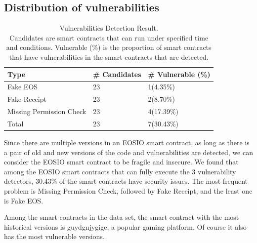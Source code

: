 \documentclass[a4paper, 10pt, conference, twocolumn]{ieeeconf}       %
\begin{document}
\subsection{Distribution of vulnerabilities}

\begin{table}[htbp]
    \centering
    \begin{tabular}{|l|l|l|}
    \hline
    Type                     & \# Candidates & \# Vulnerable (\%) \\ \hline
    Fake EOS                 & 23            & 1(4.35\%)           \\
    Fake Receipt             & 23            & 2(8.70\%)           \\
    Missing Permission Check & 23            & 4(17.39\%)          \\ \hline
    Total                    & 23            & 7(30.43\%)          \\ \hline
    \end{tabular}
    \caption{Vulnerabilities Detection Result. \\
    Candidates are smart contracts that can run under specified time and conditions. 
    Vulnerable (\%) is the proportion of smart contracts that have vulnerabilities in the smart contracts that are detected.}
\end{table}

Since there are multiple versions in an EOSIO smart contract,
as long as there is a pair of old and new versions of the code and vulnerabilities are detected,
we can consider the EOSIO smart contract to be fragile and insecure.
We found that among the EOSIO smart contracts that can fully execute the 3 vulnerability detectors,
30.43\% of the smart contracts have security issues.
The most frequent problem is Missing Permission Check,
followed by Fake Receipt,
and the least one is Fake EOS.

Among the smart contracts in the data set,
the smart contract with the most historical versions is guydgnjygige,
a popular gaming platform.
Of course it also has the most vulnerable versions.
\end{document}
